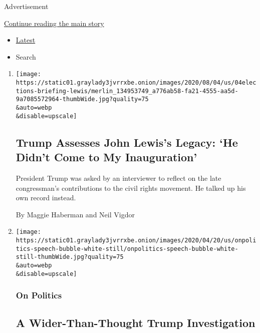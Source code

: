 Advertisement

\protect\hyperlink{after-mid1}{Continue reading the main story}

\begin{itemize}
\tightlist
\item
  \protect\hyperlink{stream-panel}{Latest}
\item
  Search
\end{itemize}

\begin{enumerate}
\def\labelenumi{\arabic{enumi}.}
\item
  \href{/2020/08/04/us/politics/trump-john-lewis-axios.html}{}

  \texttt{[image: https://static01.graylady3jvrrxbe.onion/images/2020/08/04/us/04elections-briefing-lewis/merlin\_134953749\_a776ab58-fa21-4555-aa5d-9a7085572964-thumbWide.jpg?quality=75\\\&auto=webp\\\&disable=upscale]}

  \hypertarget{trump-assesses-john-lewiss-legacy-he-didnt-come-to-my-inauguration}{%
  \subsection{Trump Assesses John Lewis's Legacy: `He Didn't Come to My
  Inauguration'}\label{trump-assesses-john-lewiss-legacy-he-didnt-come-to-my-inauguration}}

  President Trump was asked by an interviewer to reflect on the late
  congressman's contributions to the civil rights movement. He talked up
  his own record instead.

  By Maggie Haberman and Neil Vigdor
\item
  \href{/2020/08/04/us/politics/trump-prosecutors.html}{}

  \texttt{[image: https://static01.graylady3jvrrxbe.onion/images/2020/04/20/us/onpolitics-speech-bubble-white-still/onpolitics-speech-bubble-white-still-thumbWide.jpg?quality=75\\\&auto=webp\\\&disable=upscale]}

  \hypertarget{on-politics}{%
  \subsubsection{On Politics}\label{on-politics}}

  \hypertarget{a-wider-than-thought-trump-investigation}{%
  \subsection{A Wider-Than-Thought Trump
  Investigation}\label{a-wider-than-thought-trump-investigation}}


\end{enumerate}
